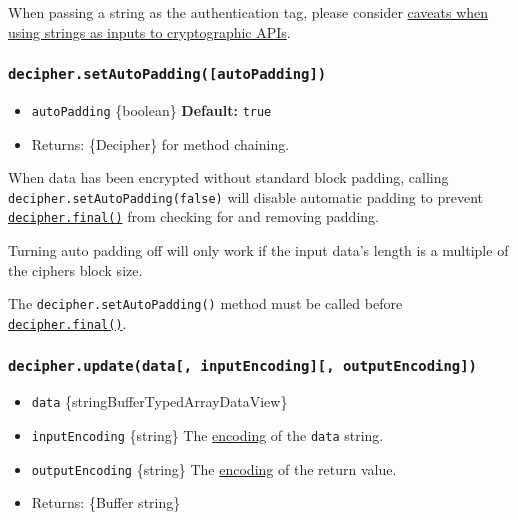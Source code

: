 When passing a string as the authentication tag, please consider
\hyperref[using-strings-as-inputs-to-cryptographic-apis]{caveats when
using strings as inputs to cryptographic APIs}.

\subsubsection{\texorpdfstring{\texttt{decipher.setAutoPadding({[}autoPadding{]})}}{decipher.setAutoPadding({[}autoPadding{]})}}\label{decipher.setautopaddingautopadding}

\begin{itemize}
\tightlist
\item
  \texttt{autoPadding} \{boolean\} \textbf{Default:} \texttt{true}
\item
  Returns: \{Decipher\} for method chaining.
\end{itemize}

When data has been encrypted without standard block padding, calling
\texttt{decipher.setAutoPadding(false)} will disable automatic padding
to prevent
\hyperref[decipherfinaloutputencoding]{\texttt{decipher.final()}} from
checking for and removing padding.

Turning auto padding off will only work if the input data's length is a
multiple of the ciphers block size.

The \texttt{decipher.setAutoPadding()} method must be called before
\hyperref[decipherfinaloutputencoding]{\texttt{decipher.final()}}.

\subsubsection{\texorpdfstring{\texttt{decipher.update(data{[},\ inputEncoding{]}{[},\ outputEncoding{]})}}{decipher.update(data{[}, inputEncoding{]}{[}, outputEncoding{]})}}\label{decipher.updatedata-inputencoding-outputencoding}

\begin{itemize}
\tightlist
\item
  \texttt{data}
  \{string\textbar Buffer\textbar TypedArray\textbar DataView\}
\item
  \texttt{inputEncoding} \{string\} The
  \href{buffer.md\#buffers-and-character-encodings}{encoding} of the
  \texttt{data} string.
\item
  \texttt{outputEncoding} \{string\} The
  \href{buffer.md\#buffers-and-character-encodings}{encoding} of the
  return value.
\item
  Returns: \{Buffer \textbar{} string\}
\end{itemize}

